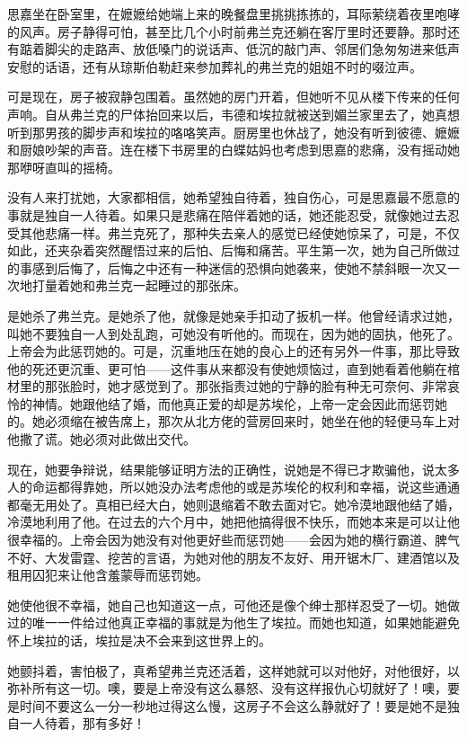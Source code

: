 \par 思嘉坐在卧室里，在嬷嬷给她端上来的晚餐盘里挑挑拣拣的，耳际萦绕着夜里咆哮的风声。房子静得可怕，甚至比几个小时前弗兰克还躺在客厅里时还要静。那时还有踮着脚尖的走路声、放低嗓门的说话声、低沉的敲门声、邻居们急匆匆进来低声安慰的话语，还有从琼斯伯勒赶来参加葬礼的弗兰克的姐姐不时的啜泣声。
\par 可是现在，房子被寂静包围着。虽然她的房门开着，但她听不见从楼下传来的任何声响。自从弗兰克的尸体抬回来以后，韦德和埃拉就被送到媚兰家里去了，她真想听到那男孩的脚步声和埃拉的咯咯笑声。厨房里也休战了，她没有听到彼德、嬷嬷和厨娘吵架的声音。连在楼下书房里的白蝶姑妈也考虑到思嘉的悲痛，没有摇动她那咿呀直叫的摇椅。
\par 没有人来打扰她，大家都相信，她希望独自待着，独自伤心，可是思嘉最不愿意的事就是独自一人待着。如果只是悲痛在陪伴着她的话，她还能忍受，就像她过去忍受其他悲痛一样。弗兰克死了，那种失去亲人的感觉已经使她惊呆了，可是，不仅如此，还夹杂着突然醒悟过来的后怕、后悔和痛苦。平生第一次，她为自己所做过的事感到后悔了，后悔之中还有一种迷信的恐惧向她袭来，使她不禁斜眼一次又一次地打量着她和弗兰克一起睡过的那张床。
\par 是她杀了弗兰克。是她杀了他，就像是她亲手扣动了扳机一样。他曾经请求过她，叫她不要独自一人到处乱跑，可她没有听他的。而现在，因为她的固执，他死了。上帝会为此惩罚她的。可是，沉重地压在她的良心上的还有另外一件事，那比导致他的死还更沉重、更可怕——这件事从来都没有使她烦恼过，直到她看着他躺在棺材里的那张脸时，她才感觉到了。那张指责过她的宁静的脸有种无可奈何、非常哀怜的神情。她跟他结了婚，而他真正爱的却是苏埃伦，上帝一定会因此而惩罚她的。她必须缩在被告席上，那次从北方佬的营房回来时，她坐在他的轻便马车上对他撒了谎。她必须对此做出交代。
\par 现在，她要争辩说，结果能够证明方法的正确性，说她是不得已才欺骗他，说太多人的命运都得靠她，所以她没办法考虑他的或是苏埃伦的权利和幸福，说这些通通都毫无用处了。真相已经大白，她则退缩着不敢去面对它。她冷漠地跟他结了婚，冷漠地利用了他。在过去的六个月中，她把他搞得很不快乐，而她本来是可以让他很幸福的。上帝会因为她没有对他更好些而惩罚她——会因为她的横行霸道、脾气不好、大发雷霆、挖苦的言语，为她对他的朋友不友好、用开锯木厂、建酒馆以及租用囚犯来让他含羞蒙辱而惩罚她。
\par 她使他很不幸福，她自己也知道这一点，可他还是像个绅士那样忍受了一切。她做过的唯一一件给过他真正幸福的事就是为他生了埃拉。而她也知道，如果她能避免怀上埃拉的话，埃拉是决不会来到这世界上的。
\par 她颤抖着，害怕极了，真希望弗兰克还活着，这样她就可以对他好，对他很好，以弥补所有这一切。噢，要是上帝没有这么暴怒、没有这样报仇心切就好了！噢，要是时间不要这么一分一秒地过得这么慢，这房子不会这么静就好了！要是她不是独自一人待着，那有多好！
